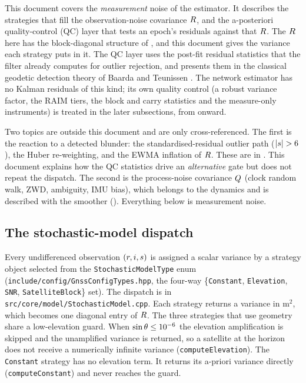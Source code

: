 \documentclass[main.tex]{subfiles}
\begin{document}
This document covers the \emph{measurement} noise of the estimator.  It
describes the strategies that fill the observation-noise covariance
$R$, and the a-posteriori quality-control (QC) layer that tests an
epoch's residuals against that $R$.  The $R$ here has the
block-diagonal structure of , and this document gives the variance
each strategy puts in it.  The QC layer uses the post-fit residual
statistics that the filter already computes for outlier rejection, and
presents them in the classical geodetic detection theory of Baarda and
Teunissen \cite{teunissen2017handbook}.
The network estimator has no Kalman residuals of this kind; its own
quality control (a robust variance factor, the RAIM tiers, the block and carry
statistics and the measure-only instruments) is treated in the later
subsections, from  onward.

Two topics are outside this document and are only cross-referenced.  The
first is the reaction to a detected blunder: the standardised-residual
outlier path ($|\sres|>6$), the Huber re-weighting, and the EWMA
inflation of $R$.  These are in .  This document explains how the QC
statistics drive an \emph{alternative} gate but does not repeat the
dispatch.  The second is the process-noise covariance $Q$ (clock
random walk, ZWD, ambiguity, IMU bias), which belongs to the dynamics
and is described with the smoother ().  Everything below is measurement noise.

\subsection{The stochastic-model dispatch}\label{sec:stoch-dispatch}

Every undifferenced observation $(r,i,s)$ is assigned a scalar
variance by a strategy object selected from the
\texttt{StochasticModelType} enum (\texttt{include/config/GnssConfigTypes.hpp},
the four-way \{\texttt{Constant}, \texttt{Elevation}, \texttt{SNR},
\texttt{SatelliteBlock}\} set).  The dispatch is in
\texttt{src/core/model/StochasticModel.cpp}.  Each strategy returns a
variance in $\mathrm{m}^2$, which becomes one diagonal entry of $R$.
The three strategies that use geometry share a low-elevation guard.
When $\sin\theta \le 10^{-6}$ the elevation amplification is skipped and the
unamplified variance is returned, so a satellite at the horizon does not
receive a numerically infinite variance (\texttt{computeElevation}).  The
\texttt{Constant} strategy has no elevation term.  It returns its
a-priori variance directly (\texttt{computeConstant}) and never reaches
the guard.
\end{document}
